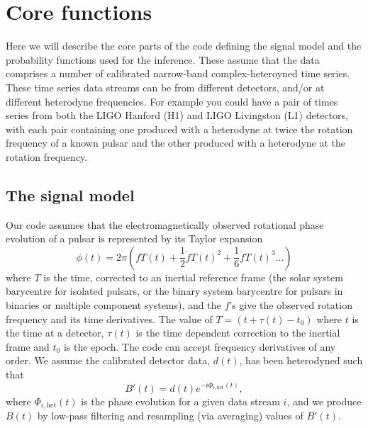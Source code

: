 \section{Core functions}

Here we will describe the core parts of the code defining the signal model and the probability functions used
for the inference. These assume that the data comprises a number of calibrated narrow-band complex-heteroyned time
series. These time series data streams can be from different detectors, and/or at different heterodyne
frequencies. For example you could have a pair of times series from both the LIGO Hanford (H1) and LIGO
Livingston (L1) detectors, with each pair containing one produced with a heterodyne at twice the rotation frequency of a known
pulsar and the other produced with a heterodyne at the rotation frequency.

\subsection{The signal model}\label{sec:model}

Our code assumes that the electromagnetically observed rotational phase evolution of a pulsar is represented by its Taylor expansion
\begin{equation}
\phi(t) = 2\pi\left(fT(t) + \frac{1}{2}\dot{f}T(t)^2 + \frac{1}{6}\ddot{f}T(t)^3 \ldots \right)
\end{equation}
where $T$ is the time, corrected to an inertial reference frame (the solar system barycentre
for isolated pulsars, or the binary system barycentre for pulsars in binaries or multiple component systems), and the $f$'s give
the observed rotation frequency and its time derivatives. The value of $T = (t+\tau(t)-t_0)$ where $t$ is the
time at a detector, $\tau(t)$ is the time dependent correction to the inertial frame and $t_0$ is the epoch.
The code can accept frequency derivatives of any order. We assume the
calibrated detector data, $d(t)$, has been heterodyned such that
\begin{equation}
B'(t) = d(t)e^{-i\Phi_{i,\text{het}}(t)},
\end{equation}
where $\Phi_{i,\text{het}}(t)$ is the phase evolution for a given data stream $i$, and we produce $B(t)$ by
low-pass filtering and resampling (via averaging) values of $B'(t)$.


